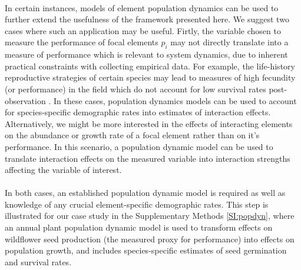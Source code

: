 \documentclass[a4,12pt]{article}
\begin{document}
        \paragraph{}
        In certain instances, models of element population dynamics can be used to further extend the usefulness of the framework presented here. We suggest two cases where such an application may be useful. Firtly, the variable chosen to measure the performance of focal elements $p_i$ may not directly translate into a measure of performance which is relevant to system dynamics,  due to inherent practical constraints with collecting empirical data. For example, the life-history reproductive strategies of certain species may lead to measures of high fecundity (or performance) in the field which do not account for low survival rates post-observation \parencite{Broekman2020}. In these cases, population dynamics models can be used to account for species-specific demographic rates into estimates of interaction effects. Alternatively, we might be more interested in the effects of interacting elements on the abundance or growth rate of a focal element rather than on it's performance. In this scenario, a population dynamic model can be used to translate interaction effects on the measured variable into interaction strengths affecting the variable of interest. 

        \paragraph{}
        In both cases, an established population dynamic model is required as well as knowledge of any crucial element-specific demographic rates. This step is illustrated for our case study in the Supplementary Methods \ref{SI:popdyn}, where an annual plant population dynamic model is used to transform effects on wildflower seed production (the measured proxy for performance) into effects on population growth, and includes species-specific estimates of seed germination and survival rates. 

\end{document}
